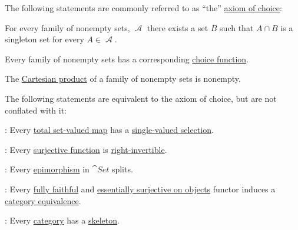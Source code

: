 \begin{theorem}\label{thm:axiom_of_choice_equivalences}
  The following statements are commonly referred to as \enquote{the} \hyperref[def:zfc/choice]{axiom of choice}:
  \begin{thmenum}[series=thm:axiom_of_choice_equivalences]
     For every family of nonempty sets, \( \mscrA \) there exists a set \( B \) such that \( A \cap B \) is a singleton set for every \( A \in \mscrA \).

     Every family of nonempty sets has a corresponding \hyperref[def:choice_function]{choice function}.

     The \hyperref[def:cartesian_product]{Cartesian product} of a family of nonempty sets is nonempty.
  \end{thmenum}

  The following statements are equivalent to the axiom of choice, but are not conflated with it:
  \begin{thmenum}[resume=thm:axiom_of_choice_equivalences]
     : Every \hyperref[def:set_valued_map/partial]{total set-valued map} has a \hyperref[def:function/selection]{single-valued selection}.

     : Every \hyperref[def:function_invertibility/surjective]{surjective function} is \hyperref[def:morphism_invertibility/right_invertible]{right-invertible}.

     : Every \hyperref[def:morphism_invertibility/right_cancellative]{epimorphism} in \hyperref[def:category_of_small_sets]{\( \cat{Set} \)} splits.

     : Every \hyperref[def:functor_invertibility/fully_faithful]{fully faithful} and \hyperref[def:functor_invertibility/surjective_on_objects]{essentially surjective on objects} functor induces a \hyperref[def:category_equivalence]{category equivalence}.

     : Every \hyperref[def:category]{category} has a \hyperref[def:skeletal_category]{skeleton}.


\end{thmenum}
\end{theorem}

